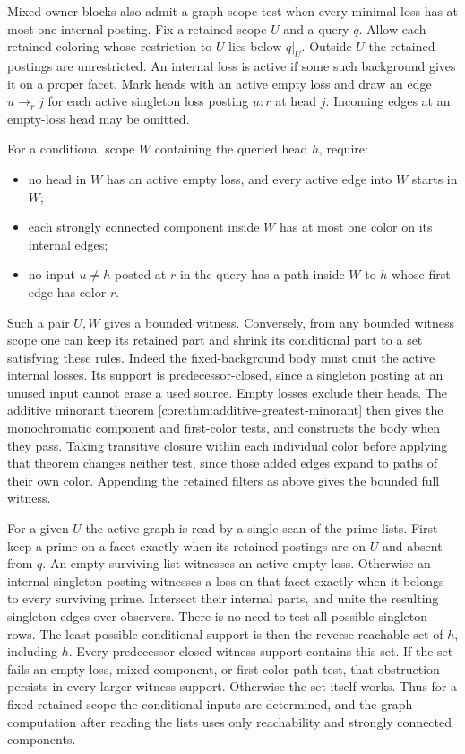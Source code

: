 Mixed-owner blocks also admit a graph scope test
when every minimal loss has at most one internal
posting. Fix a retained scope $U$ and a query $q$.
Allow each retained coloring whose restriction to
$U$ lies below $q|_U$. Outside $U$ the retained
postings are unrestricted. An internal loss is active
if some such background gives it on a proper facet.
Mark heads with an active empty loss and draw an
edge $u\to_r j$ for each active singleton loss
posting $u:r$ at head $j$. Incoming edges at an
empty-loss head may be omitted.

For a conditional scope $W$ containing the queried
head $h$, require:
\begin{itemize}
\item no head in $W$ has an active empty loss,
      and every active edge into $W$ starts in $W$;
\item each strongly connected component inside $W$
      has at most one color on its internal edges;
\item no input $u\ne h$ posted at $r$ in the query
      has a path inside $W$ to $h$ whose first edge
      has color $r$.
\end{itemize}
Such a pair $U,W$ gives a bounded witness.
Conversely, from any bounded witness scope one
can keep its retained part and shrink its
conditional part to a set satisfying these rules.
Indeed the fixed-background body must omit the
active internal losses. Its support is
predecessor-closed, since a singleton posting at
an unused input cannot erase a used source.
Empty losses exclude their heads. The additive
minorant theorem
\cref{core:thm:additive-greatest-minorant} then
gives the monochromatic component and first-color
tests, and constructs the body when they pass.
Taking transitive closure within each individual
color before applying that theorem changes neither
test, since those added edges expand to paths of
their own color.
Appending the retained filters as above gives
the bounded full witness.

For a given $U$ the active graph is read by a
single scan of the prime lists. First keep a
prime on a facet exactly when its retained
postings are on $U$ and absent from $q$.
An empty surviving list witnesses an active
empty loss. Otherwise an internal singleton
posting witnesses a loss on that facet exactly
when it belongs to every surviving prime.
Intersect their internal parts, and unite the
resulting singleton edges over observers.
There is no need to test all possible singleton
rows. The least possible conditional support
is then the reverse reachable set of $h$,
including $h$. Every predecessor-closed
witness support contains this set. If the
set fails an empty-loss, mixed-component, or
first-color path test, that obstruction persists
in every larger witness support. Otherwise
the set itself works. Thus for a fixed retained
scope the conditional inputs are determined,
and the graph computation after reading the
lists uses only reachability and strongly
connected components.


